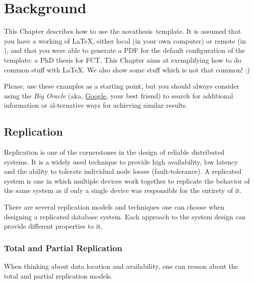
%

\chapter{Background}
\label{cha:background}

\epigraphfontsize{\small\itshape}
\setlength\epigraphwidth{12.5cm}
\setlength\epigraphrule{0pt}

This Chapter describes how to use the \gls{novathesis}\ template.  It is assumed that you have a working  of \LaTeX, either local (in your own computer) or remote (in \Overleaf), and that you were able to generate a PDF for the default configuration of the template: a PhD thesis for \gls{FCT}.
This Chapter aims at exemplifying how to do common stuff with \LaTeX. We also show some stuff which is not that common! ;)

Please, use these examples as a starting point, but you should always consider using the \emph{Big Oracle} (aka, \href{http://www.google.com}{Google}, your best friend) to search for additional information or al-ternative ways for achieving similar results.

\section{Replication} %
\label{sec:replication}
Replication is one of the cornerstones in the design of reliable distributed systems. It is a widely used technique to provide high availability, low latency and the ability to tolerate individual node losses (fault-tolerance). A replicated system is one in which multiple devices work together to replicate the behavior of the same system as if only a single device was responsible for the entirety of it.

There are several replication models and techniques one can choose when designing a replicated database system. Each approach to the system design can provide different properties to it. 

\subsection{Total and Partial Replication}
\label{sec:total_and_partial_replication}
When thinking about data location and availability, one can reason about the total and partial replication models. 

